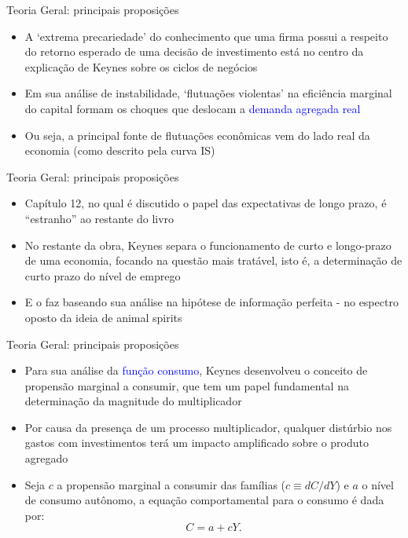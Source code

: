 \documentclass[10pt]{beamer}
\begin{document}
\begin{frame}{Teoria Geral: principais proposições}
    \begin{itemize}
        \item A `extrema precariedade' do conhecimento que uma firma possui a respeito do retorno esperado de uma decisão de investimento está no centro da explicação de Keynes sobre os ciclos de negócios
        \bigskip
        \item Em sua análise de instabilidade, `flutuações violentas' na eficiência marginal do capital formam os choques que deslocam a \textcolor{blue}{demanda agregada real}
        \bigskip
        \item Ou seja, a principal fonte de flutuações econômicas vem do lado real da economia (como descrito pela curva IS)
    \end{itemize}
\end{frame}

\begin{frame}{Teoria Geral: principais proposições}
    \begin{itemize}
        \item Capítulo 12, no qual é discutido o papel das expectativas de longo prazo, é ``estranho'' ao restante do livro
        \bigskip
        \item No restante da obra, Keynes separa o funcionamento de curto e longo-prazo de uma economia, focando na questão mais tratável, isto é, a determinação de curto prazo do nível de emprego
        \bigskip
        \item E o faz baseando sua análise na hipótese de informação perfeita - no espectro oposto da ideia de animal spirits
    \end{itemize}
\end{frame}

\begin{frame}{Teoria Geral: principais proposições}
    \begin{itemize}
        \item Para sua análise da \textcolor{blue}{função consumo}, Keynes desenvolveu o conceito de propensão marginal a consumir, que tem um papel fundamental na determinação da magnitude do multiplicador
        \bigskip
        \item Por causa da presença de um processo multiplicador, qualquer distúrbio nos gastos com investimentos terá um impacto amplificado sobre o produto agregado
        \bigskip
        \item Seja $c$ a propensão marginal a consumir das famílias ($c \equiv dC/dY$) e $a$ o nível de consumo autônomo, a equação comportamental para o consumo é dada por:
        \begin{equation}
            C = a + cY.
            \label{eq2}
        \end{equation}
    \end{itemize}
\end{frame}
\end{document}
